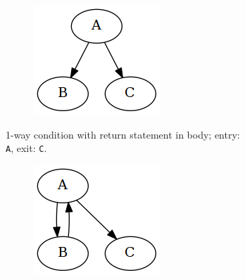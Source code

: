 \begin{figure}[htbp]
\begin{subfigure}[ht]{0.30\textwidth}
		\begin{subfigure}[ht]{0.45\textwidth}
			
		\end{subfigure}
		\begin{subfigure}[ht]{0.50\textwidth}
			\includegraphics[width=\textwidth]{inc/primitives/if_return.png}
		\end{subfigure}
		\caption{1-way condition with return statement in body; entry: \texttt{A}, exit: \texttt{C}.}
		\label{fig:if_return_graph_representation}
	\end{subfigure}
	\qquad
	\begin{subfigure}[ht]{0.32\textwidth}
		\centering
		\begin{subfigure}[ht]{0.45\textwidth}
			
		\end{subfigure}
		\begin{subfigure}[ht]{0.50\textwidth}
			\includegraphics[width=\textwidth]{inc/primitives/pre_loop.png}

\end{subfigure}
\end{subfigure}
\end{figure}
